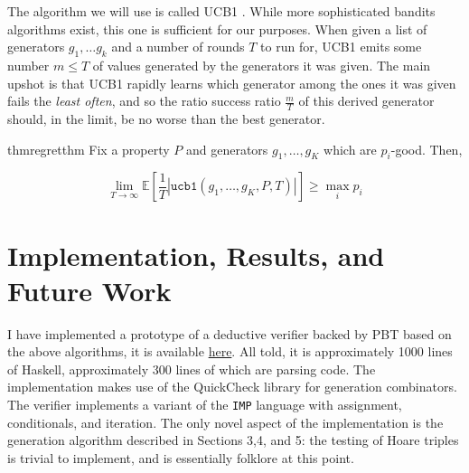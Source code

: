 \documentclass[sigconf,nonacm,review,anonymous]{acmart}
\begin{document}
The algorithm we will use is called UCB1 \cite{auer2002finite}. While more sophisticated
bandits algorithms exist, this one is sufficient for our purposes. When given a list of generators
$g_1,\dots g_k$ and a number of rounds $T$ to run for, UCB1 emits some number $m \leq T$ of values generated by the
generators it was given. The main upshot is that UCB1 rapidly learns which generator among the ones it was given
fails the \emph{least often}, and so the ratio success ratio $\frac{m}{T}$ of this derived generator should, in the limit,
be no worse than the best generator.


\begin{restatable}{thm}{regretthm}
Fix a property $P$ and generators $g_1,\dots,g_K$ which are $p_i$-good. Then,

$$
\lim_{T \to \infty} \mathbb{E}\left[\frac{1}{T}\left|\texttt{ucb1}(g_1,\dots,g_K,P,T)\right|\right] \geq \max_i p_i
$$
\end{restatable}



\section{Implementation, Results, and Future Work}
\label{sec:impl}

I have implemented a prototype of a deductive verifier backed by PBT based on the above algorithms, it is available \href{https://github.com/jdublu10/triple-testing}{here}. All told, it is approximately 1000 lines of Haskell, approximately 300 lines of which are parsing code. The implementation makes use of the QuickCheck library \cite{qc} for generation combinators. The verifier implements a variant of the \texttt{IMP} language \cite{imp}
with assignment, conditionals, and iteration. The only novel aspect of the implementation is the generation algorithm described in Sections 3,4, and 5: the testing of Hoare triples is trivial to implement, and is essentially folklore at this point.
\end{document}

